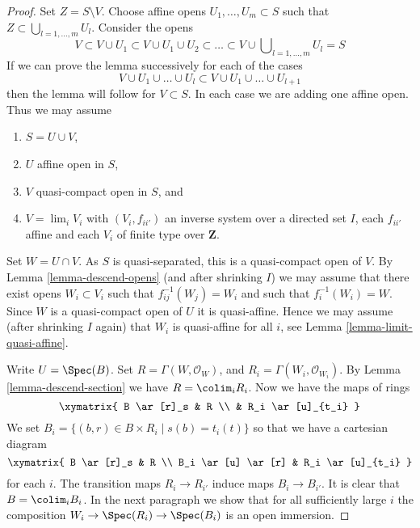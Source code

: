 \begin{proof}
Set $Z = S \setminus V$. Choose affine opens $U_1, \ldots, U_m \subset S$
such that $Z \subset \bigcup_{l = 1, \ldots, m} U_l$. Consider the opens
$$
V \subset V \cup U_1 \subset V \cup U_1 \cup U_2 \subset
\ldots \subset V \cup \bigcup\nolimits_{l = 1, \ldots, m} U_l = S
$$
If we can prove the lemma successively for each of the cases
$$
V \cup U_1 \cup \ldots \cup U_l
\subset
V \cup U_1 \cup \ldots \cup U_{l + 1}
$$
then the lemma will follow for $V \subset S$. In each case we are adding
one affine open. Thus we may assume
\begin{enumerate}
\item $S = U \cup V$,
\item $U$ affine open in $S$,
\item $V$ quasi-compact open in $S$, and
\item $V = \lim_i V_i$ with $(V_i, f_{ii'})$
an inverse system over a directed set $I$, each $f_{ii'}$
affine and each $V_i$ of finite type over $\mathbf{Z}$.
\end{enumerate}
Set $W = U \cap V$. As $S$ is quasi-separated, this is a quasi-compact open
of $V$. By Lemma \ref{lemma-descend-opens}
(and after shrinking $I$) we may assume that there exist
opens $W_i \subset V_i$ such that $f_{ij}^{-1}(W_j) = W_i$
and such that $f_i^{-1}(W_i) = W$. Since $W$ is a quasi-compact open
of $U$ it is quasi-affine. Hence we may assume (after shrinking $I$ again)
that $W_i$ is quasi-affine for all $i$, see
Lemma \ref{lemma-limit-quasi-affine}.

\medskip\noindent
Write $U = \Spec(B)$. Set $R = \Gamma(W, \mathcal{O}_W)$,
and $R_i = \Gamma(W_i, \mathcal{O}_{W_i})$.
By Lemma \ref{lemma-descend-section} we have $R = \colim_i R_i$.
Now we have the maps of rings
$$
\xymatrix{
B \ar[r]_s & R \\
& R_i \ar[u]_{t_i}
}
$$
We set $B_i = \{(b, r) \in B \times R_i \mid s(b) = t_i(t)\}$ so that we
have a cartesian diagram
$$
\xymatrix{
B \ar[r]_s & R \\
B_i \ar[u] \ar[r] & R_i \ar[u]_{t_i}
}
$$
for each $i$. The transition maps $R_i \to R_{i'}$ induce maps
$B_i \to B_{i'}$. It is clear that $B = \colim_i B_i$.
In the next paragraph we show that for all sufficiently large $i$
the composition $W_i \to \Spec(R_i) \to \Spec(B_i)$ is an open immersion.


\end{proof}
